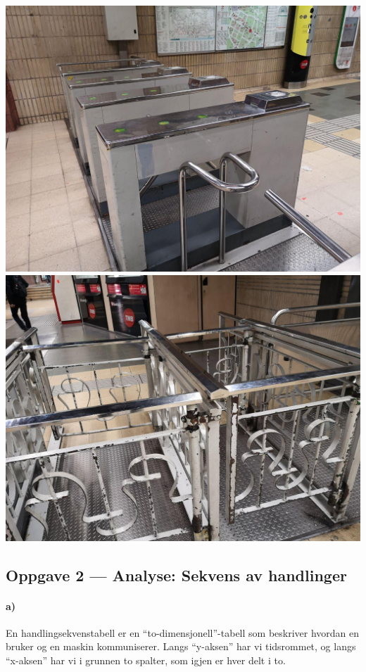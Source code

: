 \documentclass{../../myassignment}
\begin{document}
	\includegraphics[scale=0.2]{pictures/entrances.jpg}
	\includegraphics[scale=0.2]{pictures/exits.jpg}

	\subsection*{Oppgave 2 --- Analyse: Sekvens av handlinger}
	\paragraph*{a)}
	En handlingsekvenstabell er en ``to-dimensjonell''-tabell som beskriver hvordan en bruker og en maskin kommuniserer. Langs ``y-aksen'' har vi tidsrommet, og langs ``x-aksen'' har vi i grunnen to spalter, som igjen er hver delt i to.
\end{document}
